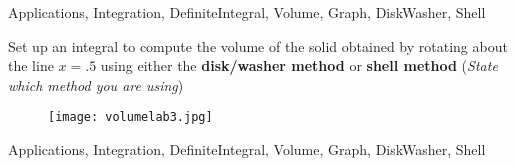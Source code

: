 \begin{tagblock}{Applications, Integration, DefiniteIntegral, Volume, Graph, DiskWasher, Shell}
\begin{question}
\begin{enumerate}
\begin{enumerate}
 Set up an integral to compute the volume of the solid obtained by rotating about the line $x=.5$ using either the \textbf{disk/washer method} or  \textbf{shell method} (\emph{State which method you are using})
\begin{figure}[h]
\texttt{[image: volumelab3.jpg]}
\end{figure}



\end{enumerate}

\end{enumerate}


    
\begin{tags}
       Applications, Integration, DefiniteIntegral, Volume, Graph, DiskWasher, Shell
\end{tags}
    
\begin{diary}
        
\end{diary}
	
\begin{solution}

\end{solution}
	
\end{question}

\end{tagblock}

